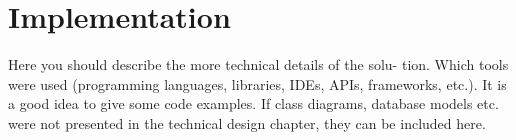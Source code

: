 \chapter{Implementation}

Here you should describe the more technical details of the solu- tion. Which tools were used (programming languages, libraries, IDEs, APIs, frameworks, etc.). It is a good idea to give some code examples. If class diagrams, database models etc. were not presented in the technical design chapter, they can be included here.
